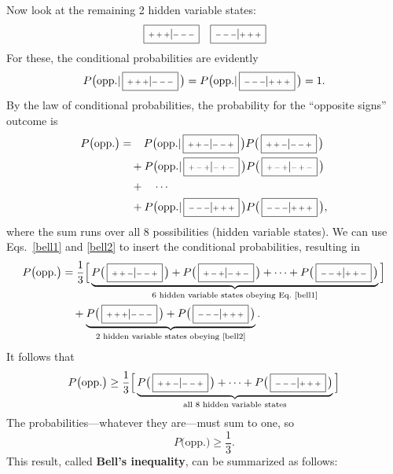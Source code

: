\documentclass[pra,12pt]{revtex4-2}
\def\hvbox[#1]#2{\,\boxed{\scalebox{0.7}{$\,#1$}|\scalebox{0.7}{$#2\,$}}}
\begin{document}
Now look at the remaining 2 hidden variable states:
\begin{equation*}
    \hvbox[+++]{---} \;\;\;
    \hvbox[---]{+++}
\end{equation*}
For these, the conditional probabilities are evidently
\begin{equation}
  P\big(\textrm{opp.} | \hvbox[+++]{---}\,\big) =
  P\big(\textrm{opp.} | \hvbox[---]{+++}\,\big) = 1.
  \label{bell2}
\end{equation}
By the law of conditional probabilities, the probability for the
``opposite signs'' outcome is
\begin{align}
  \begin{aligned}
    P\big(\textrm{opp.}\big) &= \;\;\;
    P\big(\textrm{opp.} | \hvbox[++-]{--+}\,\big)
    P\big(\hvbox[++-]{--+}\,\big) \\
    &\quad+ P\big(\textrm{opp.} | \hvbox[+-+]{-+-}\,\big)
    P\big(\hvbox[+-+]{-+-}\,\big) \\
    &\quad+ \quad \cdots \\
    &\quad+ P\big(\textrm{opp.} | \hvbox[---]{+++}\,\big)
    P\big(\hvbox[---]{+++}\,\big),
  \end{aligned}
\end{align}
where the sum runs over all 8 possibilities (hidden variable states).
We can use Eqs.~\eqref{bell1} and \eqref{bell2} to insert the
conditional probabilities, resulting in
\begin{align}
  \begin{aligned}
    P\big(\textrm{opp.}\big) &=
    \frac{1}{3} \Big[\underbrace{P\big(\hvbox[++-]{--+}\,\big)
      + P\big(\hvbox[+-+]{-+-}\,\big)
      + \cdots + P\big(\hvbox[--+]{++-}\,\big)}_{\textrm{6 hidden variable states
obeying Eq.~\eqref{bell1}}}\Big] \\
    &\quad + \underbrace{P\big(\hvbox[+++]{---}\,\big)
    + P\big(\hvbox[---]{+++}\,\big)}_{\textrm{2 hidden variable states obeying \eqref{bell2}}}.
  \end{aligned}
\end{align}
It follows that
\begin{equation}
  P\big(\textrm{opp.}\big) \ge
  \frac{1}{3} \Big[\underbrace{P\big(\hvbox[++-]{--+}\,\big)
      + \cdots + P\big(\hvbox[---]{+++}\,\big)}_{\textrm{all 8 hidden variable states}}
    \Big]
  \label{bellprob}
\end{equation}
The probabilities---whatever they are---must sum to one, so
\begin{equation}
  P\big(\textrm{opp.}\big) \ge \frac{1}{3}.
  \label{bellresult}
\end{equation}
This result, called \textbf{Bell's inequality}, can be summarized as
follows:
\end{document}
